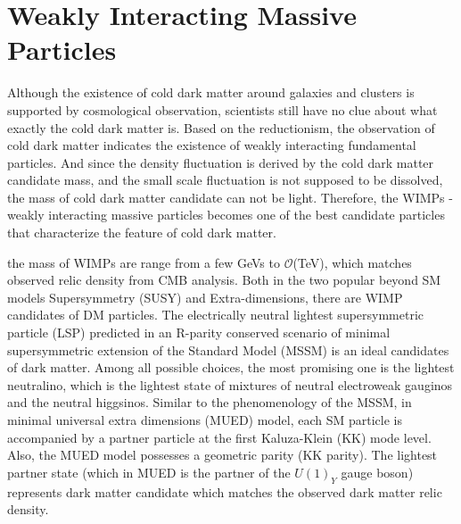 \section{Weakly Interacting Massive Particles}
\label{sec:dms2}
\par Although the existence of cold dark matter around galaxies and clusters is supported by cosmological observation, scientists still have no clue about what exactly the cold dark matter is. Based on the reductionism, the observation of cold dark matter indicates the existence of weakly interacting fundamental particles. And since the density fluctuation is derived by the cold dark matter candidate mass, and the small scale fluctuation is not supposed to be dissolved, the mass of cold dark matter candidate can not be light. Therefore, the WIMPs - weakly interacting massive particles becomes one of the best candidate particles that characterize the feature of cold dark matter.

\par the mass of WIMPs are range from a few GeVs to $\mathcal{O}$(TeV), which matches observed relic density from CMB analysis. Both in the two popular beyond SM models Supersymmetry (SUSY) and Extra-dimensions, there are WIMP candidates of DM particles. The electrically neutral lightest supersymmetric particle (LSP) predicted in an R-parity conserved scenario of minimal supersymmetric extension of the Standard Model (MSSM) is an ideal candidates of dark matter. Among all possible choices, the most promising one is the lightest neutralino, which is the lightest state of mixtures of neutral electroweak gauginos and the neutral higgsinos\cite{Feng:2010gw}. Similar to the phenomenology of the MSSM, in minimal universal extra dimensions (MUED) model, each SM particle is accompanied by a partner particle at the first Kaluza-Klein (KK) mode level. Also, the MUED model possesses a geometric parity (KK parity). The lightest partner state (which in MUED is the partner of the $U(1)_Y$ gauge boson) represents dark matter candidate which matches the observed dark matter relic density\cite{Servant:2002aq}.

